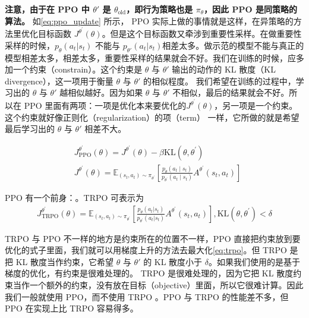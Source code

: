 \textbf{注意，由于在 PPO 中 $\theta'$ 是 $\theta_{\text{old}}$，即行为策略也是 $\pi_{\theta}$，因此 PPO 是同策略的算法。}
如\eqref{eq:ppo_update} 所示，
PPO 实际上做的事情就是这样，在异策略的方法里优化目标函数 $J^{\theta^{\prime}}(\theta)$。但是这个目标函数又牵涉到重要性采样。在做重要性采样的时候，$p_{\theta}\left(a_{t} | s_{t}\right)$ 不能与 $p_{\theta'}\left(a_{t} | s_{t}\right)$相差太多。做示范的模型不能与真正的模型相差太多，相差太多，重要性采样的结果就会不好。我们在训练的时候，应多加一个约束（constrain）。这个约束是 $\theta$  与 $\theta'$ 输出的动作的 KL 散度（KL divergence），这一项用于衡量 $\theta$ 与 $\theta'$ 的相似程度。
我们希望在训练的过程中，学习出的 $\theta$ 与 $\theta'$  越相似越好。因为如果 $\theta$ 与 $\theta'$ 不相似，最后的结果就会不好。所以在 PPO 里面有两项：一项是优化本来要优化的$J^{\theta^{\prime}}(\theta)$，另一项是一个约束。这个约束就好像正则化（regularization）的项（term） 一样，它所做的就是希望最后学习出的 $\theta$ 与 $\theta'$ 相差不大。

\begin{equation}
    \label{eq:ppo_update}
    \begin{aligned}
        &J_{\mathrm{PPO}}^{\theta^{\prime}}(\theta)=J^{\theta^{\prime}}(\theta)-\beta \mathrm{KL}\left(\theta, \theta^{\prime}\right) \\
        &J^{\theta^{\prime}}(\theta)=\mathbb{E}_{\left(s_{t}, a_{t}\right) \sim \pi_{\theta^{\prime}}}\left[\frac{p_{\theta}\left(a_{t} \mid s_{t}\right)}{p_{\theta^{\prime}}\left(a_{t} \mid s_{t}\right)} A^{\theta^{\prime}}\left(s_{t}, a_{t}\right)\right]
        \end{aligned}
\end{equation}


PPO 有一个前身：。TRPO 可表示为
\begin{equation}
    \label{eq:trpo}
    \begin{aligned}
        J_{\mathrm{TRPO}}^{\theta^{\prime}}(\theta)=\mathbb{E}_{\left(s_{t}, a_{t}\right) \sim \pi_{\theta^{\prime}}}\left[\frac{p_{\theta}\left(a_{t} | s_{t}\right)}{p_{\theta^{\prime}}\left(a_{t} | s_{t}\right)} A^{\theta^{\prime}}\left(s_{t}, a_{t}\right)\right],\mathrm{KL}\left(\theta, \theta^{\prime}\right)<\delta
        \end{aligned}
\end{equation}

TRPO 与 PPO 不一样的地方是约束所在的位置不一样，PPO 直接把约束放到要优化的式子里面，我们就可以用梯度上升的方法去最大化\eqref{eq:trpo}。但 TRPO 是把 KL 散度当作约束，它希望 $\theta$ 与 $\theta'$ 的 KL 散度小于 $\delta$。如果我们使用的是基于梯度的优化，有约束是很难处理的。
TRPO 是很难处理的，因为它把 KL 散度约束当作一个额外的约束，没有放在目标（objective）里面，所以它很难计算。因此我们一般就使用 PPO，而不使用 TRPO 。PPO 与 TRPO 的性能差不多，但 PPO 在实现上比 TRPO 容易得多。

